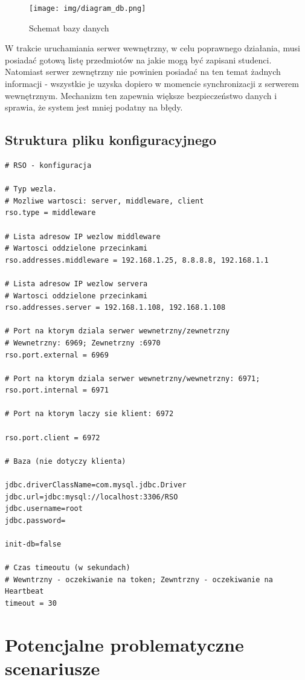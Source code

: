 {\begin{figure}[h!tb]
\begin{center}
\texttt{[image: img/diagram\_db.png]} 
\caption{Schemat bazy danych}
\label{img:schem_kom}
\end{center}
\end{figure}

\par{W trakcie uruchamiania serwer wewnętrzny, w celu poprawnego działania, musi posiadać gotową listę przedmiotów na jakie mogą być zapisani studenci. Natomiast serwer zewnętrzny nie powinien posiadać na ten temat żadnych informacji - wszystkie je uzyska dopiero w momencie synchronizacji z serwerem wewnętrznym. Mechanizm ten zapewnia większe bezpieczeństwo danych i sprawia, że system jest mniej podatny na błędy.}


\subsection[Struktura pliku konfiguracyjnego]{Struktura pliku konfiguracyjnego}
\begin{lstlisting}
# RSO - konfiguracja

# Typ wezla.
# Mozliwe wartosci: server, middleware, client
rso.type = middleware

# Lista adresow IP wezlow middleware
# Wartosci oddzielone przecinkami
rso.addresses.middleware = 192.168.1.25, 8.8.8.8, 192.168.1.1

# Lista adresow IP wezlow servera
# Wartosci oddzielone przecinkami
rso.addresses.server = 192.168.1.108, 192.168.1.108

# Port na ktorym dziala serwer wewnetrzny/zewnetrzny
# Wewnetrzny: 6969; Zewnetrzny :6970
rso.port.external = 6969

# Port na ktorym dziala serwer wewnetrzny/wewnetrzny: 6971;
rso.port.internal = 6971

# Port na ktorym laczy sie klient: 6972

rso.port.client = 6972

# Baza (nie dotyczy klienta)

jdbc.driverClassName=com.mysql.jdbc.Driver
jdbc.url=jdbc:mysql://localhost:3306/RSO
jdbc.username=root
jdbc.password=

init-db=false

# Czas timeoutu (w sekundach)
# Wewntrzny - oczekiwanie na token; Zewntrzny - oczekiwanie na Heartbeat
timeout = 30
\end{lstlisting}


\section[Potencjalne problematyczne scenariusze]{Potencjalne problematyczne scenariusze}

}
